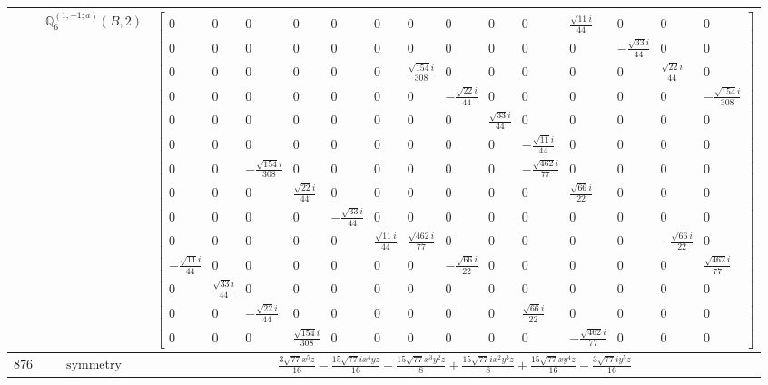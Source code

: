 \documentclass[fleqn,8pt,landscape]{jsarticle}
\begin{document}
\begin{longtable}{ccc}
$  $ & $ \mathbb{Q}_{6}^{(1,-1;a)}(B,2) $ & $ \begin{bmatrix} 0 & 0 & 0 & 0 & 0 & 0 & 0 & 0 & 0 & 0 & \frac{\sqrt{11} i}{44} & 0 & 0 & 0 \\ 0 & 0 & 0 & 0 & 0 & 0 & 0 & 0 & 0 & 0 & 0 & - \frac{\sqrt{33} i}{44} & 0 & 0 \\ 0 & 0 & 0 & 0 & 0 & 0 & \frac{\sqrt{154} i}{308} & 0 & 0 & 0 & 0 & 0 & \frac{\sqrt{22} i}{44} & 0 \\ 0 & 0 & 0 & 0 & 0 & 0 & 0 & - \frac{\sqrt{22} i}{44} & 0 & 0 & 0 & 0 & 0 & - \frac{\sqrt{154} i}{308} \\ 0 & 0 & 0 & 0 & 0 & 0 & 0 & 0 & \frac{\sqrt{33} i}{44} & 0 & 0 & 0 & 0 & 0 \\ 0 & 0 & 0 & 0 & 0 & 0 & 0 & 0 & 0 & - \frac{\sqrt{11} i}{44} & 0 & 0 & 0 & 0 \\ 0 & 0 & - \frac{\sqrt{154} i}{308} & 0 & 0 & 0 & 0 & 0 & 0 & - \frac{\sqrt{462} i}{77} & 0 & 0 & 0 & 0 \\ 0 & 0 & 0 & \frac{\sqrt{22} i}{44} & 0 & 0 & 0 & 0 & 0 & 0 & \frac{\sqrt{66} i}{22} & 0 & 0 & 0 \\ 0 & 0 & 0 & 0 & - \frac{\sqrt{33} i}{44} & 0 & 0 & 0 & 0 & 0 & 0 & 0 & 0 & 0 \\ 0 & 0 & 0 & 0 & 0 & \frac{\sqrt{11} i}{44} & \frac{\sqrt{462} i}{77} & 0 & 0 & 0 & 0 & 0 & - \frac{\sqrt{66} i}{22} & 0 \\ - \frac{\sqrt{11} i}{44} & 0 & 0 & 0 & 0 & 0 & 0 & - \frac{\sqrt{66} i}{22} & 0 & 0 & 0 & 0 & 0 & \frac{\sqrt{462} i}{77} \\ 0 & \frac{\sqrt{33} i}{44} & 0 & 0 & 0 & 0 & 0 & 0 & 0 & 0 & 0 & 0 & 0 & 0 \\ 0 & 0 & - \frac{\sqrt{22} i}{44} & 0 & 0 & 0 & 0 & 0 & 0 & \frac{\sqrt{66} i}{22} & 0 & 0 & 0 & 0 \\ 0 & 0 & 0 & \frac{\sqrt{154} i}{308} & 0 & 0 & 0 & 0 & 0 & 0 & - \frac{\sqrt{462} i}{77} & 0 & 0 & 0 \end{bmatrix} $ \\ \hline
$ 876 $ & $ \text{symmetry} $ & $ \frac{3 \sqrt{77} x^{5} z}{16} - \frac{15 \sqrt{77} i x^{4} y z}{16} - \frac{15 \sqrt{77} x^{3} y^{2} z}{8} + \frac{15 \sqrt{77} i x^{2} y^{3} z}{8} + \frac{15 \sqrt{77} x y^{4} z}{16} - \frac{3 \sqrt{77} i y^{5} z}{16} $ \\

\end{longtable}
\end{document}
